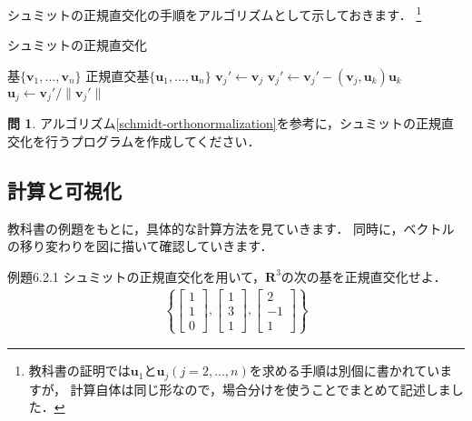 \documentclass[dvipdfmx]{jsarticle}
\theoremstyle{definition}
\newtheorem{question}{問}[section]
\begin{document}
シュミットの正規直交化の手順をアルゴリズムとして示しておきます．
\footnote{
    教科書の証明では$\bm{u}_1$と$\bm{u}_j (j=2,\ldots,n)$を求める手順は別個に書かれていますが，
    計算自体は同じ形なので，場合分けを使うことでまとめて記述しました．
}

\begin{algorithm}
    \caption{シュミットの正規直交化}
    \label{schmidt-orthonormalization}
    \begin{algorithmic}
        \renewcommand{\algorithmicrequire}{\textbf{Input:}}
        \renewcommand{\algorithmicensure}{\textbf{Output:}}
        \REQUIRE 基$\{ \bm{v}_1, \ldots, \bm{v}_n \}$
        \ENSURE 正規直交基$\{ \bm{u}_1, \ldots, \bm{u}_n \}$
            \STATE $\bm{v}_j' \leftarrow \bm{v}_j$
                    \STATE $\bm{v}_j' \leftarrow \bm{v}_j' - (\bm{v}_j, \bm{u}_k) \bm{u}_k$
                \ENDFOR
            \ENDIF
            \STATE $\bm{u}_j \leftarrow \bm{v}_j' / \| \bm{v}_j' \|$
        \ENDFOR
    \end{algorithmic}
\end{algorithm}


\begin{question}
    アルゴリズム\ref{schmidt-orthonormalization}を参考に，シュミットの正規直交化を行うプログラムを作成してください．
\end{question}



\subsection{計算と可視化}
教科書の例題をもとに，具体的な計算方法を見ていきます．
同時に，ベクトルの移り変わりを図に描いて確認していきます．

\begin{itembox}[l]{例題6.2.1}
    シュミットの正規直交化を用いて，$\bm{R}^3$の次の基を正規直交化せよ．
    \begin{align*}
        \left\{
            \begin{bmatrix} 1 \\ 1 \\ 0 \end{bmatrix} ,
            \begin{bmatrix} 1 \\ 3 \\ 1 \end{bmatrix} ,
            \begin{bmatrix} 2 \\ -1 \\ 1 \end{bmatrix}
        \right\}
    \end{align*}
\end{itembox}
\end{document}
